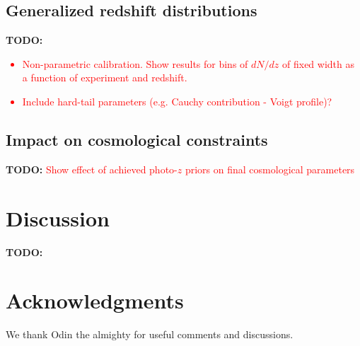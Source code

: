 \documentclass[prd,twocolumn]{revtex4}
\newcommand{\TODO}[1]{{\bf TODO:} \textcolor{red}{#1}}
\begin{document}
  \subsection{Generalized redshift distributions} \label{ssec:results.outliers}
    \TODO{
      \begin{itemize}
        \item Non-parametric calibration. Show results for bins of $dN/dz$ of fixed
          width as a function of experiment and redshift.
        \item Include hard-tail parameters (e.g. Cauchy contribution - Voigt profile)?
      \end{itemize}
    }
    
  \subsection{Impact on cosmological constraints} \label{ssec:results.cosmo}
    \TODO{Show effect of achieved photo-$z$ priors on final cosmological parameters}

\section{Discussion}\label{ssec:discuss}
  \TODO{\lipsum[12]}

\section*{Acknowledgments}
  We thank Odin the almighty for useful comments and discussions.
 

\end{document}
